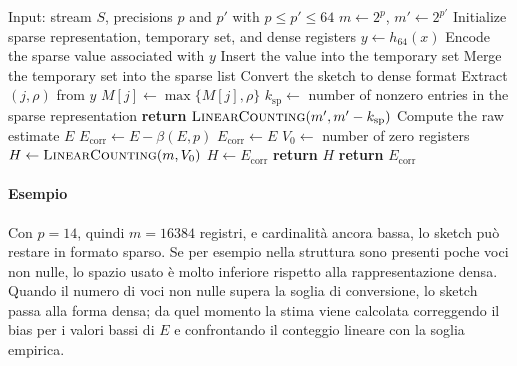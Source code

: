 \begin{algorithm}[htbp]
    \caption{HyperLogLog++}
    \label{alg:hllpp}
    \begin{algorithmic}
        \STATE Input: stream $S$, precisions $p$ and $p'$ with $p \le p' \le 64$
        \STATE $m \leftarrow 2^p$, \quad $m' \leftarrow 2^{p'}$
        \STATE Initialize sparse representation, temporary set, and dense registers
            \STATE $y \leftarrow h_{64}(x)$
                \STATE Encode the sparse value associated with $y$
                \STATE Insert the value into the temporary set
                    \STATE Merge the temporary set into the sparse list
                \ENDIF
                    \STATE Convert the sketch to dense format
                \ENDIF
            \ELSE
                \STATE Extract $(j,\rho)$ from $y$
                \STATE $M[j] \leftarrow \max\{M[j],\rho\}$
            \ENDIF
        \ENDFOR
            \STATE $k_{\text{sp}} \leftarrow$ number of nonzero entries in the sparse representation
            \STATE \textbf{return} $\textsc{LinearCounting}(m',m'-k_{\text{sp}})$
        \ELSE
            \STATE Compute the raw estimate $E$
                \STATE $E_{\mathrm{corr}} \leftarrow E-\beta(E,p)$
            \ELSE
                \STATE $E_{\mathrm{corr}} \leftarrow E$
            \ENDIF
            \STATE $V_0 \leftarrow$ number of zero registers
                \STATE $H \leftarrow \textsc{LinearCounting}(m,V_0)$
            \ELSE
                \STATE $H \leftarrow E_{\mathrm{corr}}$
            \ENDIF
                \STATE \textbf{return} $H$
            \ELSE
                \STATE \textbf{return} $E_{\mathrm{corr}}$
            \ENDIF
        \ENDIF
    \end{algorithmic}
\end{algorithm}

\paragraph{Esempio}
Con $p=14$, quindi $m=16384$ registri, e cardinalità ancora bassa, lo sketch
può restare in formato sparso. Se per esempio nella struttura sono presenti poche voci non nulle, 
lo spazio usato è molto inferiore rispetto
alla rappresentazione densa. Quando il numero di voci non nulle supera la soglia di
conversione, lo sketch passa alla forma densa; da quel momento la stima viene
calcolata correggendo il bias per i valori bassi di $E$ e confrontando il
conteggio lineare con la soglia empirica.


